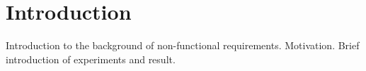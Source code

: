 
\section{Introduction}
Introduction to the background of non-functional requirements. Motivation. Brief introduction of experiments and result.
